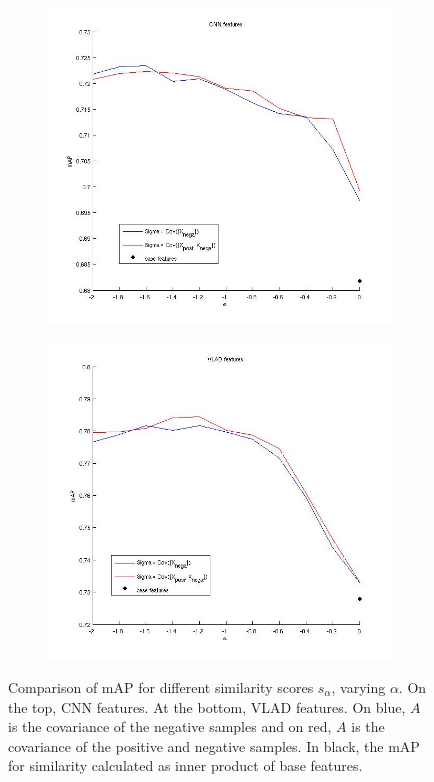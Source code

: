 \documentclass[12pt,letterpaper]{article}
\begin{document}
\begin{figure}[!h]
\centering
\begin{subfigure}[b]{0.45\textwidth}
\includegraphics[width=\textwidth]{whitening_cnn.jpg}
\end{subfigure}
\begin{subfigure}[b]{0.45\textwidth}
\includegraphics[width=\textwidth]{whitening_vlad.jpg}
\end{subfigure}
\caption{Comparison of mAP for different similarity scores $s_{\alpha}$, varying $\alpha$. On the top, CNN features. At the bottom, VLAD features. On blue, $A$ is the covariance of the negative samples and on red, $A$ is the covariance of the positive and negative samples. In black, the mAP for similarity calculated as inner product of base features.}
\label{salpha:vladcnn}
\end{figure}
\end{document}
